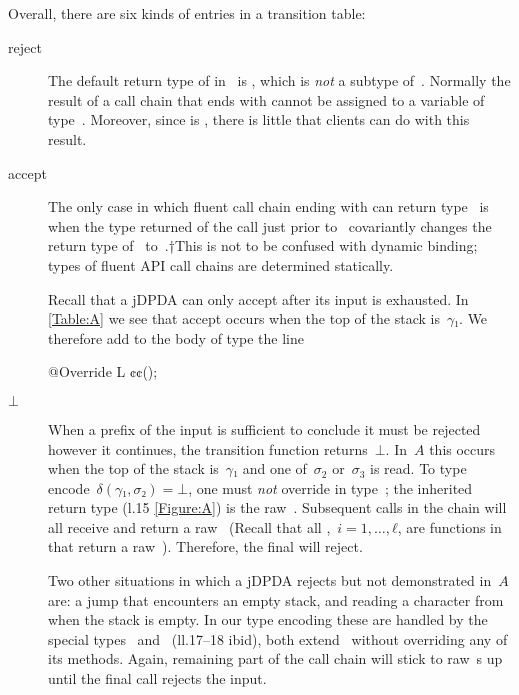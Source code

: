 Overall, there are six kinds of entries in a transition table:
\begin{description}

  \item[\textsf{reject}]
  The default return type of \cc{\$()} in~ is , which
  is \emph{not} a subtype of~. Normally the result of a call chain that ends with \cc{\$()}
  cannot be assigned to a variable of type~. Moreover, since  is ,
  there is little that clients can do with this result.

  \item[\textsf{accept}]
  The only case in which fluent call chain ending with \cc{\$()} can return
    type~ is when the type returned of the call just prior to~ covariantly
    changes the return type of~\cc{\$()} to~.†{This is not to be confused with dynamic binding;
    types of fluent API call chains are determined statically.}
  \par
  Recall that a jDPDA can only accept after its input is exhausted.
  In \cref{Table:A} we see that \textsf{accept} occurs when the top of the stack is~$γ₁$.
  We therefore add to the body of type  the line
  \begin{JAVA}
@Override L ¢\gobble$¢$();
  \end{JAVA}

  \item[$⊥$]
  When a prefix of the input is sufficient to conclude it must be rejected however it continues,
    the transition function returns~$⊥$.
  In~$A$ this occurs when the top of the stack is~$γ₁$ and one of~$σ_2$ or~$σ_3$ is read.
  To type encode~$δ(γ₁,σ₂) =⊥$, one must \emph{not} override  in type~;
    the inherited return type (l.15 \cref{Figure:A}) is the raw~.
  Subsequent calls in the chain will all receive and return a raw~
    (Recall that all ,~$i=1,…,ℓ$, are functions in~ that return a raw~).
  Therefore, the final \cc{\$()} will reject.
  \par
  Two other situations in which a jDPDA rejects but not demonstrated in~$A$ are:
    a \textsf{jump} that encounters an empty stack, and reading a character from when the stack is empty.
  In our type encoding these are handled by the special
    types~ and~ (ll.17--18 ibid), both extend~ without
    overriding any of its methods. Again, remaining part of the call chain will stick to
    raw~s up until the final \cc{\$()} call rejects the input.


\end{description}
